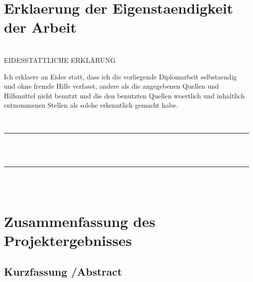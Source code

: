 \documentclass[12pt,a4paper]{article}
\newcommand{\mylinespacing}[0]{\onehalfspace}	%
\begin{document}
\mylinespacing
{




\clearpage\vfill\newpage%

\section*{\Large\sc Erklaerung der Eigenstaendigkeit der Arbeit}
	\hfill\\[ 8mm]
	EIDESSTATTLICHE ERKLÄRUNG
	\\[3mm]
\begin{spacing}{1.5}
	\noindent%
	Ich erklaere an Eides statt, dass ich die vorliegende Diplomarbeit selbstaendig und
	ohne fremde Hilfe verfasst, andere als die angegebenen Quellen und Hilfsmittel
	nicht benutzt und die den benutzten Quellen woertlich und inhaltlich entnommenen
	Stellen als solche erkenntlich gemacht habe.
\end{spacing}\hfill
	\\[12mm]
	\parbox[b]{52mm}{
		\rule{50mm}{0.2pt}\rule{0pt}{25mm}
		\\\hspace*{6mm}{Ort, Datum}
		\\[0mm]
	}
	\hfill
	\parbox[b]{72mm}{
		\rule{70mm}{0.2pt}\rule{0pt}{25mm}
		\\\hspace*{6mm}{Verfasser, Verfasserinnen}
		\\\hspace*{6mm}{Vor- und Zunamen}
	}







\section{Zusammenfassung des Projektergebnisses}
 \subsection{Kurzfassung /Abstract}
 
}
\end{document}
